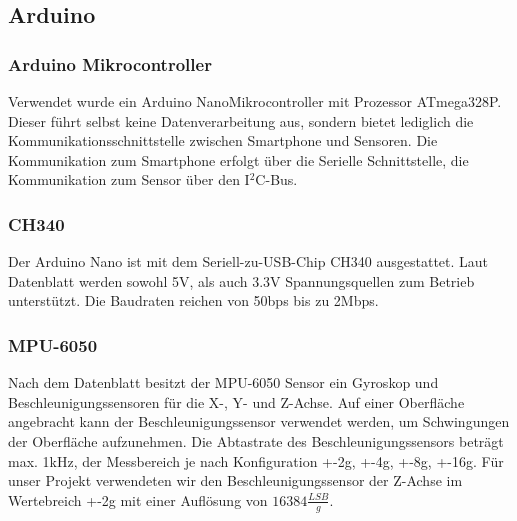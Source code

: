 \subsection{Arduino}
\label{sec:Arduino}

\subsubsection{Arduino Mikrocontroller}
Verwendet wurde ein \glqq Arduino Nano\grqq  Mikrocontroller mit Prozessor ATmega328P. Dieser führt selbst keine Datenverarbeitung aus, sondern bietet lediglich die Kommunikationsschnittstelle zwischen Smartphone und Sensoren. Die Kommunikation zum Smartphone erfolgt über die Serielle Schnittstelle, die Kommunikation zum Sensor über den I$^2$C-Bus. 


\subsubsection{CH340}
Der Arduino Nano ist mit dem  Seriell-zu-USB-Chip CH340 ausgestattet.
Laut Datenblatt \cite{CH340} werden sowohl 5V, als auch 3.3V Spannungsquellen zum Betrieb unterstützt.
Die Baudraten reichen von 50bps bis zu 2Mbps.


\subsubsection{MPU-6050}
Nach dem Datenblatt \cite{MPU6050} besitzt der MPU-6050 Sensor ein Gyroskop und Beschleunigungssensoren für die X-, Y- und Z-Achse.
Auf einer Oberfläche angebracht kann der Beschleunigungssensor verwendet werden, um Schwingungen der Oberfläche aufzunehmen.
Die Abtastrate des Beschleunigungssensors beträgt max. 1kHz, der Messbereich je nach Konfiguration +-2g, +-4g, +-8g, +-16g.
Für unser Projekt verwendeten wir den Beschleunigungssensor der Z-Achse im Wertebreich +-2g mit einer Auflösung von $16384 \frac{LSB}{g}$.
